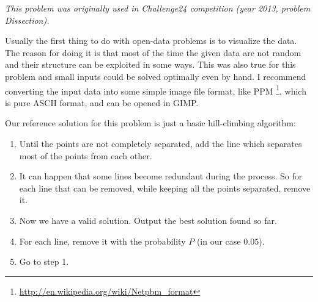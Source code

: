 


\textit{This problem was originally used in Challenge24 competition (year 2013, problem Dissection).}

Usually the first thing to do with open-data problems is to visualize the data.
The reason for doing it is that most of the time the given data are not random
and their structure can be exploited in some ways. This was also true for this
problem and small inputs could be solved optimally even by hand.
I recommend converting the input data into some simple image file format,
like PPM \footnote{\url{http://en.wikipedia.org/wiki/Netpbm\_format}}, which is pure
ASCII format, and can be opened in GIMP.

Our reference solution for this problem is just a basic hill-climbing algorithm:
\begin{enumerate}
\item Until the points are not completely separated, add the line which separates most
of the points from each other.
\item It can happen that some lines become redundant during the process. So for each
line that can be removed, while keeping all the points separated, remove it.
\item Now we have a valid solution. Output the best solution found so far.
\item For each line, remove it with the probability $P$ (in our case $0.05$).
\item Go to step 1.
\end{enumerate}
